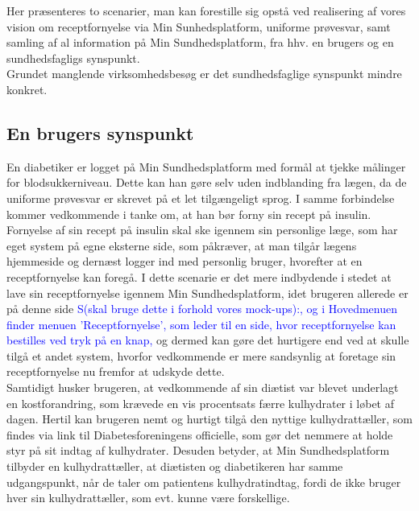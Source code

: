 Her præsenteres to scenarier, man kan forestille sig opstå ved realisering af vores vision om receptfornyelse via Min Sunhedsplatform, uniforme prøvesvar, samt samling af al information 
 på Min Sundhedsplatform, fra hhv. en brugers og en sundhedsfagligs synspunkt. \\
 Grundet manglende virksomhedsbesøg er det sundhedsfaglige synspunkt mindre konkret. 

\subsection{En brugers synspunkt}
En diabetiker er logget på Min Sundhedsplatform med formål at tjekke målinger for blodsukkerniveau. Dette kan han gøre selv uden indblanding fra lægen, da de uniforme prøvesvar er skrevet på et let tilgængeligt sprog. I samme forbindelse kommer vedkommende i tanke om, at han bør forny sin recept på insulin. Fornyelse af sin recept på insulin skal ske igennem sin personlige læge, som har eget system på egne eksterne side, som påkræver, at man tilgår lægens hjemmeside og dernæst logger ind med personlig bruger, hvorefter at en receptfornyelse kan foregå. I dette scenarie er det mere indbydende i stedet at lave sin receptfornyelse igennem Min Sundhedsplatform, idet brugeren allerede er på denne side 
\textcolor{blue}{S(skal bruge dette i forhold vores mock-ups):, og i Hovedmenuen finder menuen 'Receptfornyelse', som leder til en side, hvor receptfornyelse kan bestilles ved tryk på en knap,} 
og dermed kan gøre det hurtigere end ved at skulle tilgå et andet system, hvorfor vedkommende er mere sandsynlig at foretage sin receptfornyelse nu fremfor at udskyde dette.\\
Samtidigt husker brugeren, at vedkommende af sin diætist var blevet underlagt en kostforandring, som krævede en vis procentsats færre kulhydrater i løbet af dagen. Hertil kan brugeren nemt og hurtigt tilgå den nyttige kulhydrattæller, som findes via link til Diabetesforeningens officielle, som gør det nemmere at holde styr på sit indtag af kulhydrater. Desuden betyder, at Min Sundhedsplatform tilbyder en kulhydrattæller, at diætisten og diabetikeren har samme udgangspunkt, når de taler om patientens kulhydratindtag, fordi de ikke bruger hver sin kulhydrattæller, som evt. kunne være forskellige. 


